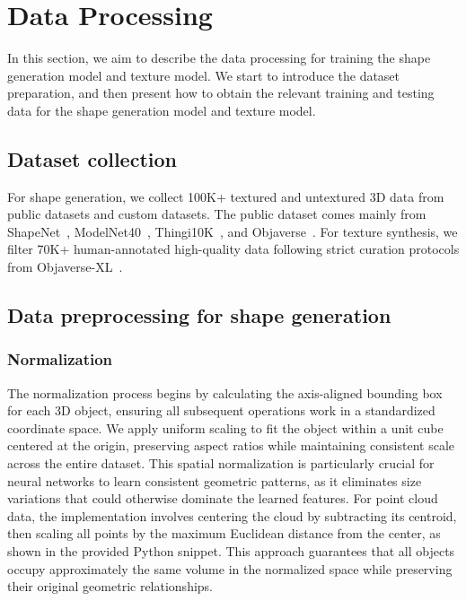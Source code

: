 

\section{Data Processing}
In this section, we aim to describe the data processing for training the shape generation model and texture model. We start to introduce the dataset preparation, and then present how to obtain the relevant training and testing data for the shape generation model and texture model.

\subsection{Dataset collection}
For shape generation, we collect 100K+ textured and untextured 3D data from public datasets and custom datasets. The public dataset comes mainly from ShapeNet~\cite{chang2015shapenet}, ModelNet40~\cite{wu20153d}, Thingi10K~\cite{zhou2016thingi10k}, and Objaverse~\cite{deitke2023objaverse,deitke2023objaversexl}. For texture synthesis, we filter 70K+ human-annotated high-quality data following strict curation protocols from Objaverse-XL~\cite{deitke2023objaversexl}.

\subsection{Data preprocessing for shape generation}

\subsubsection{Normalization}
The normalization process begins by calculating the axis-aligned bounding box for each 3D object, ensuring all subsequent operations work in a standardized coordinate space. We apply uniform scaling to fit the object within a unit cube centered at the origin, preserving aspect ratios while maintaining consistent scale across the entire dataset. This spatial normalization is particularly crucial for neural networks to learn consistent geometric patterns, as it eliminates size variations that could otherwise dominate the learned features. For point cloud data, the implementation involves centering the cloud by subtracting its centroid, then scaling all points by the maximum Euclidean distance from the center, as shown in the provided Python snippet. This approach guarantees that all objects occupy approximately the same volume in the normalized space while preserving their original geometric relationships.



